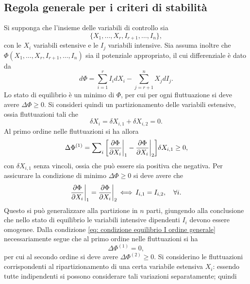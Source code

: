 \subsection{Regola generale per i criteri di stabilità}
Si supponga che l'insieme delle variabili di controllo sia 
\begin{equation}
    \{X_1,\dots,X_{r},I_{r+1},\dots,I_n\},
\end{equation}
con le $X_i$ variabili estensive e le $I_j$ variabili intensive. Sia assuma inoltre che $\Phi(X_1,\dots,X_{r},I_{r+1},\dots,I_n)$ sia il potenziale appropriato, il cui differenziale è dato da
\begin{equation}
    d\Phi = \sum_{i = 1}^rI_idX_i - \sum_{j = r + 1}^nX_jdI_j.
\end{equation}
Lo stato di equilibrio è un minimo di $\Phi$, per cui per ogni fluttuazione si deve avere $\Delta\Phi \ge 0$. Si consideri quindi un partizionamento delle variabili estensive, ossia fluttuazioni tali che
\begin{equation}
    \delta X_i = \delta X_{i,1} + \delta X_{i,2} = 0.
\end{equation}
Al primo ordine nelle fluttuazioni si ha allora
\begin{equation}
    \Delta\Phi^{(1)} = \sum\nolimits_i\bigg[\frac{\partial\Phi}{\partial X_i}\bigg|_1 - \frac{\partial\Phi}{\partial X_i}\bigg|_2\bigg]\delta X_{i,1} \ge 0,
\end{equation}
con $\delta X_{i,1}$ senza vincoli, ossia che può essere sia positiva che negativa. Per assicurare la condizione di minimo $\Delta\Phi \ge 0$ si deve avere che
\begin{equation}
\label{eq: condizione equilibrio I ordine generale}
    \frac{\partial\Phi}{\partial X_i}\bigg|_1 = \frac{\partial\Phi}{\partial X_i}\bigg|_2\,\Longleftrightarrow\,I_{i,1} = I_{i,2},\quad\forall i.
\end{equation}
Questo si può generalizzare alla partizione in $n$ parti, giungendo alla conclusione che nello stato di equilibrio le variabili intensive dipendenti $I_i$ devono essere omogenee. Dalla condizione \eqref{eq: condizione equilibrio I ordine generale} necessariamente segue che al primo ordine nelle fluttuazioni si ha
\begin{equation}
    \Delta\Phi^{(1)} = 0,
\end{equation}
per cui al secondo ordine si deve avere $\Delta\Phi^{(2)} \ge 0$. Si considerino le fluttuazioni corrispondenti al ripartizionamento di una certa variabile estensiva $X_i$: essendo tutte indipendenti si possono considerare tali variazioni separatamente; quindi
